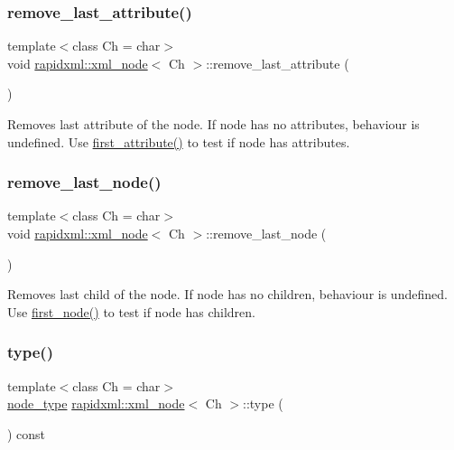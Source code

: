 \subsubsection{\texorpdfstring{remove\+\_\+last\+\_\+attribute()}{remove\_last\_attribute()}}
{\footnotesize\ttfamily template$<$class Ch = char$>$ \\
void \hyperlink{classrapidxml_1_1xml__node}{rapidxml\+::xml\+\_\+node}$<$ Ch $>$\+::remove\+\_\+last\+\_\+attribute (\begin{DoxyParamCaption}{ }\end{DoxyParamCaption})\hspace{0.3cm}{\ttfamily [inline]}}

Removes last attribute of the node. If node has no attributes, behaviour is undefined. Use \hyperlink{classrapidxml_1_1xml__node_ab816ab6f13ee4b0588d5b76b0697511c}{first\+\_\+attribute()} to test if node has attributes. \mbox{\label{classrapidxml_1_1xml__node_a9182512e948ec451a83f116cce7c7674}} 
\subsubsection{\texorpdfstring{remove\+\_\+last\+\_\+node()}{remove\_last\_node()}}
{\footnotesize\ttfamily template$<$class Ch = char$>$ \\
void \hyperlink{classrapidxml_1_1xml__node}{rapidxml\+::xml\+\_\+node}$<$ Ch $>$\+::remove\+\_\+last\+\_\+node (\begin{DoxyParamCaption}{ }\end{DoxyParamCaption})\hspace{0.3cm}{\ttfamily [inline]}}

Removes last child of the node. If node has no children, behaviour is undefined. Use \hyperlink{classrapidxml_1_1xml__node_acdf3691224d683f50692616a92a75d3f}{first\+\_\+node()} to test if node has children. \mbox{\label{classrapidxml_1_1xml__node_a5f91729128856b0aaab598d4364ace60}} 
\subsubsection{\texorpdfstring{type()}{type()}\hspace{0.1cm}{\footnotesize\ttfamily [1/2]}}
{\footnotesize\ttfamily template$<$class Ch = char$>$ \\
\hyperlink{rapidxml_8hpp_abb456db38f7efb746c4330eed6072a7c}{node\+\_\+type} \hyperlink{classrapidxml_1_1xml__node}{rapidxml\+::xml\+\_\+node}$<$ Ch $>$\+::type (\begin{DoxyParamCaption}{ }\end{DoxyParamCaption}) const\hspace{0.3cm}{\ttfamily [inline]}}

